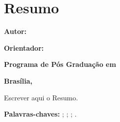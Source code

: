 \chapter*{Resumo}

\vspace{\onelineskip}
 
\noindent \textbf{\imprimirtitulo}

\vspace{5mm}

\noindent \textbf{Autor: \imprimirautor}

\noindent \textbf{Orientador: \imprimirorientador}

\noindent \textbf{Programa de Pós Graduação em \imprimircurso}

\noindent \textbf{Brasília, \imprimirdata}

\vspace{5mm}
\noindent
Escrever aqui o Resumo.

\vspace{5mm}
\noindent \textbf{Palavras-chaves:} \imprimirpalavrachaveum; \imprimirpalavrachavedois; \imprimirpalavrachavetres; \imprimirpalavrachavequatro.

\clearpage